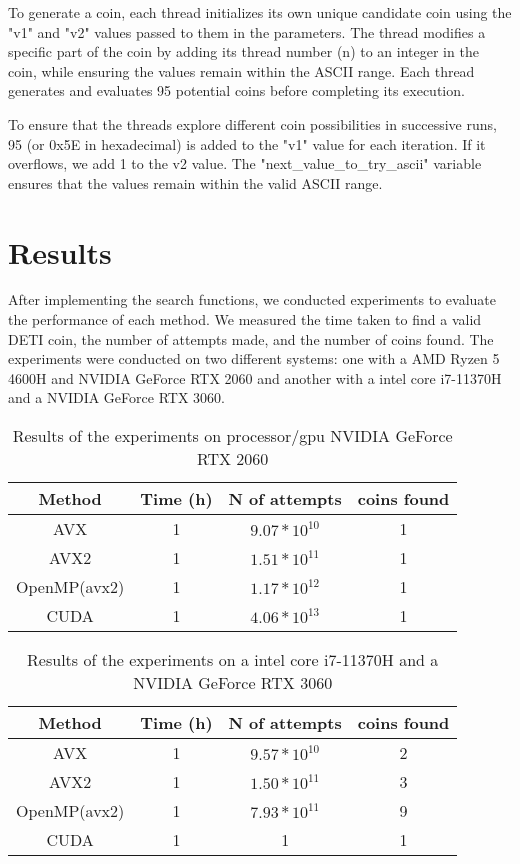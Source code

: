 \documentclass[a4paper,12pt]{article}
\begin{document}
To generate a coin, each thread initializes its own unique candidate coin using the "v1" and "v2" values passed to them in the parameters. The thread modifies a specific part of the coin by adding its thread number (n) to an integer in the coin, while ensuring the values remain within the ASCII range. Each thread generates and evaluates 95 potential coins before completing its execution.

To ensure that the threads explore different coin possibilities in successive runs, 95 (or 0x5E in hexadecimal) is added to the "v1" value for each iteration. If it overflows, we add 1 to the v2 value. The "next\_value\_to\_try\_ascii" variable ensures that the values remain within the valid ASCII range.

\section{Results}
\label{sec:results}

After implementing the search functions, we conducted experiments to evaluate the performance
of each method. We measured the time taken to find a valid DETI coin, the number of attempts
made, and the number of coins found. The experiments were conducted on two different systems:
one with a AMD Ryzen 5 4600H and NVIDIA GeForce RTX 2060 and another with a intel core i7-11370H and a NVIDIA GeForce RTX 
3060.

\begin{table}[H]
    \centering
    \begin{tabular}{|c|c|c|c|}
        \hline
        \textbf{Method} & \textbf{Time (h)} & \textbf{N of attempts} & \textbf{coins found} \\
        \hline
        AVX & 1 & $9.07*10^{10}$ & 1  \\
        AVX2 & 1 & $1.51*10^{11}$ & 1 \\
        OpenMP(avx2) & 1 & $1.17*10^{12}$ & 1 \\
        CUDA & 1 & $4.06*10^{13}$ & 1  \\
        \hline
    \end{tabular}
    \caption{Results of the experiments on processor/gpu NVIDIA GeForce RTX 2060}
    \label{tab:results1}
\end{table}

\begin{table}[H]
    \centering
    \begin{tabular}{|c|c|c|c|}
        \hline
        \textbf{Method} & \textbf{Time (h)} & \textbf{N of attempts} & \textbf{coins found} \\
        \hline
        AVX & 1 & $9.57*10^{10}$ & 2  \\
        AVX2 & 1 &  $1.50*10^{11}$ & 3 \\
        OpenMP(avx2) & 1 & $7.93*10^{11}$ & 9 \\
        CUDA & 1 & 1 & 1  \\
        \hline
    \end{tabular}
    \caption{Results of the experiments on a intel core i7-11370H and a NVIDIA GeForce RTX 3060}
    \label{tab:results2}
\end{table}
\end{document}
